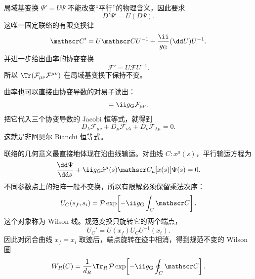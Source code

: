 局域基变换 $\Psi'=U\Psi$ 不能改变“平行”的物理含义，因此要求
\begin{equation}
 D'\Psi'=U(D\Psi).
 \label{eq:covariant-derivative-covariance-dp68}
\end{equation}
这唯一固定联络的有限变换律
\begin{equation}
 {
 \mathscr C'
 =U\mathscr C U^{-1}
 +\frac{\ii}{g_{\rm G}}(\dd U)U^{-1}.}
 \label{eq:finite-gauge-connection-dp11}
\end{equation}
并进一步给出曲率的协变变换
\begin{equation}
 {\mathcal F'=U\mathcal F U^{-1}.}
 \label{eq:curvature-gauge-covariance-dp68}
\end{equation}
所以 $\Tr(\mathcal F_{\mu\nu}\mathcal F^{\mu\nu})$ 在局域基变换下保持不变。

曲率也可以直接由协变导数的对易子读出：
\begin{equation}
 [D_\mu,D_\nu]=\ii g_{\rm G}\mathcal F_{\mu\nu}.
 \label{eq:covariant-commutator-curvature-dp68}
\end{equation}
把它代入三个协变导数的 Jacobi 恒等式，就得到
\begin{equation}
 {
 D_\lambda\mathcal F_{\mu\nu}
 +D_\mu\mathcal F_{\nu\lambda}
 +D_\nu\mathcal F_{\lambda\mu}=0.}
 \label{eq:nonabelian-bianchi-dp11}
\end{equation}
这就是非阿贝尔 Bianchi 恒等式。

联络的几何意义最直接地体现在沿曲线输运。对曲线 $C:x^\mu(s)$，平行输运方程为
\begin{equation}
 \frac{\dd\Psi}{\dd s}
 +\ii g_{\rm G}\dot x^\mu(s)\mathscr C_\mu[x(s)]\Psi(s)=0.
 \label{eq:parallel-transport-ode-dp68}
\end{equation}
不同参数点上的矩阵一般不交换，所以有限解必须保留乘法次序：
\begin{equation}
 {
 U_C(s_f,s_i)
 =\mathcal P\exp\!\left[-\ii g_{\rm G}\int_C\mathscr C\right].}
 \label{eq:wilson-line-general-dp11}
\end{equation}
这个对象称为 Wilson 线。规范变换只旋转它的两个端点，
\begin{equation}
 {
 U_C' =U(x_f)U_CU^{-1}(x_i).}
 \label{eq:wilson-endpoint-covariance-dp68}
\end{equation}
因此对闭合曲线 $x_f=x_i$ 取迹后，端点旋转在迹中相消，得到规范不变的 Wilson 圈
\begin{equation}
 {
 W_R(C)=\frac1{d_R}\Tr_R\,
 \mathcal P\exp\!\left[-\ii g_{\rm G}\oint_C\mathscr C\right].}
 \label{eq:wilson-loop-general-dp11}
\end{equation}

